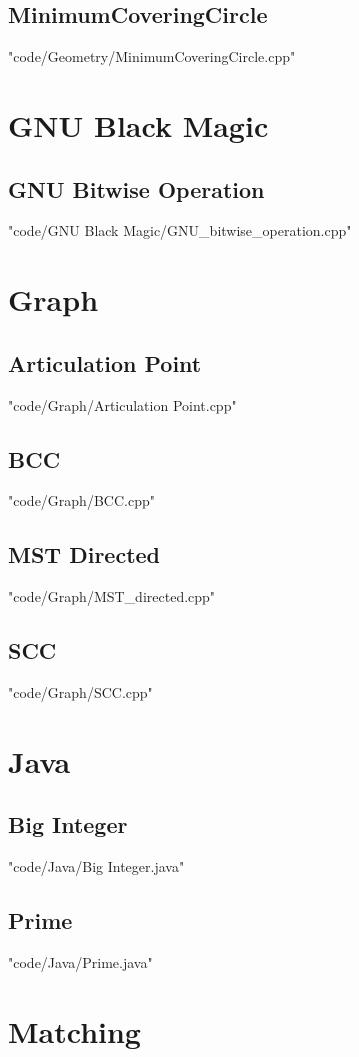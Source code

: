\documentclass [landscape,8pt,a4paper,twocolumn]{article}
\begin{document}
\subsection{MinimumCoveringCircle}
 {"code/Geometry/MinimumCoveringCircle.cpp"}
\section{GNU Black Magic}
\subsection{GNU Bitwise Operation}
 {"code/GNU Black Magic/GNU_bitwise_operation.cpp"}
\section{Graph}
\subsection{Articulation Point}
 {"code/Graph/Articulation Point.cpp"}
\subsection{BCC}
 {"code/Graph/BCC.cpp"}
\subsection{MST Directed}
 {"code/Graph/MST_directed.cpp"}
\subsection{SCC}
 {"code/Graph/SCC.cpp"}
\section{Java}
\subsection{Big Integer}
 {"code/Java/Big Integer.java"}
\subsection{Prime}
 {"code/Java/Prime.java"}
\section{Matching}
\end{document}
